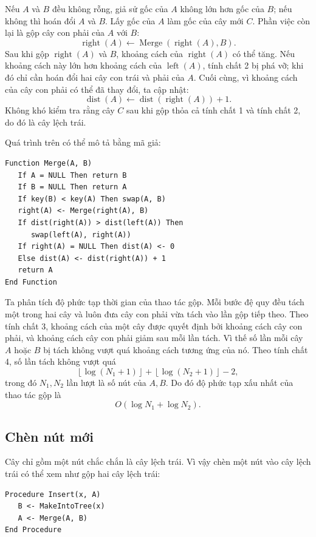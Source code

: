 \documentclass[11pt]{article}
\begin{document}
Nếu \(A\) và \(B\) đều không rỗng, giả sử gốc của \(A\) không lớn hơn gốc của
\(B\); nếu không thì hoán đổi \(A\) và \(B\). Lấy gốc của \(A\) làm gốc của cây
mới \(C\). Phần việc còn lại là gộp cây con phải của \(A\) với \(B\):
\[
  \operatorname{right}(A)
  \gets
  \operatorname{Merge}(\operatorname{right}(A),B).
\]
Sau khi gộp \(\operatorname{right}(A)\) và \(B\), khoảng cách của
\(\operatorname{right}(A)\) có thể tăng. Nếu khoảng cách này lớn hơn khoảng cách
của \(\operatorname{left}(A)\), tính chất 2 bị phá vỡ; khi đó chỉ cần hoán đổi
hai cây con trái và phải của \(A\). Cuối cùng, vì khoảng cách của cây con phải
có thể đã thay đổi, ta cập nhật:
\[
  \operatorname{dist}(A)
  \gets
  \operatorname{dist}(\operatorname{right}(A))+1.
\]
Không khó kiểm tra rằng cây \(C\) sau khi gộp thỏa cả tính chất 1 và tính chất
2, do đó là cây lệch trái.

Quá trình trên có thể mô tả bằng mã giả:

\begin{verbatim}
Function Merge(A, B)
   If A = NULL Then return B
   If B = NULL Then return A
   If key(B) < key(A) Then swap(A, B)
   right(A) <- Merge(right(A), B)
   If dist(right(A)) > dist(left(A)) Then
      swap(left(A), right(A))
   If right(A) = NULL Then dist(A) <- 0
   Else dist(A) <- dist(right(A)) + 1
   return A
End Function
\end{verbatim}

Ta phân tích độ phức tạp thời gian của thao tác gộp. Mỗi bước đệ quy đều tách
một trong hai cây và luôn đưa cây con phải vừa tách vào lần gộp tiếp theo. Theo
tính chất 3, khoảng cách của một cây được quyết định bởi khoảng cách cây con
phải, và khoảng cách cây con phải giảm sau mỗi lần tách. Vì thế số lần mỗi cây
\(A\) hoặc \(B\) bị tách không vượt quá khoảng cách tương ứng của nó. Theo tính
chất 4, số lần tách không vượt quá
\[
  \left\lfloor\log(N_1+1)\right\rfloor
  +
  \left\lfloor\log(N_2+1)\right\rfloor
  - 2,
\]
trong đó \(N_1,N_2\) lần lượt là số nút của \(A,B\). Do đó độ phức tạp xấu nhất
của thao tác gộp là
\[
  O(\log N_1+\log N_2).
\]

\subsection{Chèn nút mới}

Cây chỉ gồm một nút chắc chắn là cây lệch trái. Vì vậy chèn một nút vào cây
lệch trái có thể xem như gộp hai cây lệch trái:

\begin{verbatim}
Procedure Insert(x, A)
   B <- MakeIntoTree(x)
   A <- Merge(A, B)
End Procedure
\end{verbatim}
\end{document}

